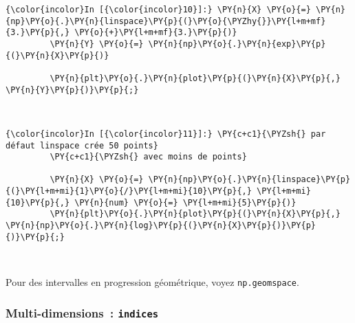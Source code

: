     \begin{Verbatim}[commandchars=\\\{\},frame=single,framerule=0.3mm,rulecolor=\color{cellframecolor}]
{\color{incolor}In [{\color{incolor}10}]:} \PY{n}{X} \PY{o}{=} \PY{n}{np}\PY{o}{.}\PY{n}{linspace}\PY{p}{(}\PY{o}{\PYZhy{}}\PY{l+m+mf}{3.}\PY{p}{,} \PY{o}{+}\PY{l+m+mf}{3.}\PY{p}{)}
         \PY{n}{Y} \PY{o}{=} \PY{n}{np}\PY{o}{.}\PY{n}{exp}\PY{p}{(}\PY{n}{X}\PY{p}{)}
         
         \PY{n}{plt}\PY{o}{.}\PY{n}{plot}\PY{p}{(}\PY{n}{X}\PY{p}{,} \PY{n}{Y}\PY{p}{)}\PY{p}{;}
\end{Verbatim}


    \begin{center}
    \end{center}
    { \hspace*{\fill} \\}
    
    \begin{Verbatim}[commandchars=\\\{\},frame=single,framerule=0.3mm,rulecolor=\color{cellframecolor}]
{\color{incolor}In [{\color{incolor}11}]:} \PY{c+c1}{\PYZsh{} par défaut linspace crée 50 points}
         \PY{c+c1}{\PYZsh{} avec moins de points}
         
         \PY{n}{X} \PY{o}{=} \PY{n}{np}\PY{o}{.}\PY{n}{linspace}\PY{p}{(}\PY{l+m+mi}{1}\PY{o}{/}\PY{l+m+mi}{10}\PY{p}{,} \PY{l+m+mi}{10}\PY{p}{,} \PY{n}{num} \PY{o}{=} \PY{l+m+mi}{5}\PY{p}{)}
         \PY{n}{plt}\PY{o}{.}\PY{n}{plot}\PY{p}{(}\PY{n}{X}\PY{p}{,} \PY{n}{np}\PY{o}{.}\PY{n}{log}\PY{p}{(}\PY{n}{X}\PY{p}{)}\PY{p}{)}\PY{p}{;}
\end{Verbatim}


    \begin{center}
    \end{center}
    { \hspace*{\fill} \\}
    
    Pour des intervalles en progression géométrique, voyez
\texttt{np.geomspace}.

    \hypertarget{multi-dimensions-indices}{%
\subsubsection{\texorpdfstring{Multi-dimensions~:
\texttt{indices}}{Multi-dimensions~: indices}}\label{multi-dimensions-indices}}

